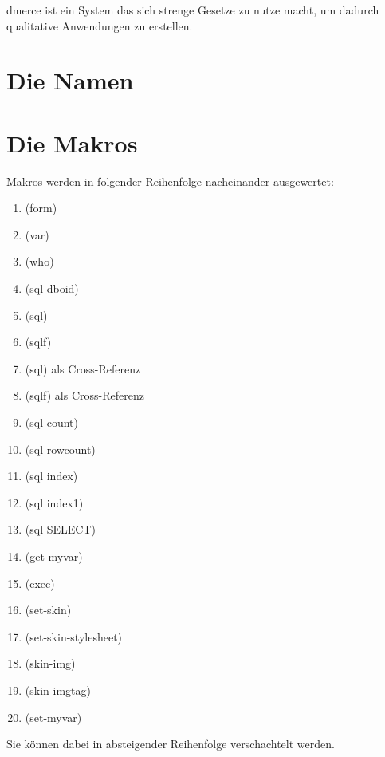 dmerce ist ein System das sich strenge Gesetze zu nutze macht, um
dadurch qualitative Anwendungen zu erstellen.

\section{Die Namen}

\section{Die Makros}

Makros werden in folgender Reihenfolge nacheinander ausgewertet:

\medskip

\begin{enumerate}
\item (form)
\item (var)
\item (who)
\item (sql dboid)
\item (sql)
\item (sqlf)
\item (sql) als Cross-Referenz
\item (sqlf) als Cross-Referenz
\item (sql count)
\item (sql rowcount)
\item (sql index)
\item (sql index1)
\item (sql SELECT)
\item (get-myvar)
\item (exec)
\item (set-skin)
\item (set-skin-stylesheet)
\item (skin-img)
\item (skin-imgtag)
\item (set-myvar)
\end{enumerate}

\medskip

Sie k\"onnen dabei in absteigender Reihenfolge verschachtelt werden.

\bigskip



